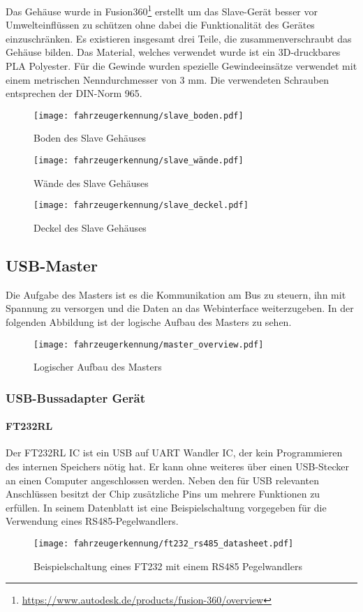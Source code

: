 Das Gehäuse wurde in Fusion360\footnote{\url{https://www.autodesk.de/products/fusion-360/overview}} erstellt um das Slave-Gerät besser vor Umwelteinflüssen zu schützen ohne dabei die Funktionalität des Gerätes einzuschränken. Es existieren insgesamt
drei Teile, die zusammenverschraubt das Gehäuse bilden. Das Material, welches verwendet wurde
ist ein 3D-druckbares PLA Polyester. Für die Gewinde wurden spezielle Gewindeeinsätze verwendet
mit einem metrischen Nenndurchmesser von 3 mm. Die verwendeten Schrauben entsprechen
der DIN-Norm 965.

\begin{figure}[!htb]
        \texttt{[image: fahrzeugerkennung/slave\_boden.pdf]}
        \caption{Boden des Slave Gehäuses}
    \endminipage\hfill
        \texttt{[image: fahrzeugerkennung/slave\_wände.pdf]}
        \caption{Wände des Slave Gehäuses}
    \endminipage\hfill
        \texttt{[image: fahrzeugerkennung/slave\_deckel.pdf]}
        \caption{Deckel des Slave Gehäuses}
    \endminipage
\end{figure}

\subsection{USB-Master}
Die Aufgabe des Masters ist es die Kommunikation am Bus zu steuern, ihn mit Spannung zu versorgen und die Daten an das Webinterface weiterzugeben. 
In der folgenden Abbildung ist der logische Aufbau des Masters zu sehen.

\begin{figure}[H]
    \centering
    \texttt{[image: fahrzeugerkennung/master\_overview.pdf]}
    \caption{Logischer Aufbau des Masters}
\end{figure}
\subsubsection{USB-Bussadapter Gerät}
\paragraph{FT232RL}\mbox{} 

Der FT232RL IC ist ein USB auf UART Wandler IC, der kein Programmieren des internen Speichers nötig hat. Er kann ohne weiteres über einen USB-Stecker an einen Computer angeschlossen werden. 
Neben den für USB relevanten Anschlüssen besitzt der Chip zusätzliche Pins um mehrere Funktionen zu erfüllen. In seinem Datenblatt ist eine Beispielschaltung vorgegeben für die Verwendung eines RS485-Pegelwandlers.
\begin{figure}[H]
    \centering
    \texttt{[image: fahrzeugerkennung/ft232\_rs485\_datasheet.pdf]}
    \caption{Beispielschaltung eines FT232 mit einem RS485 Pegelwandlers}
\end{figure}

